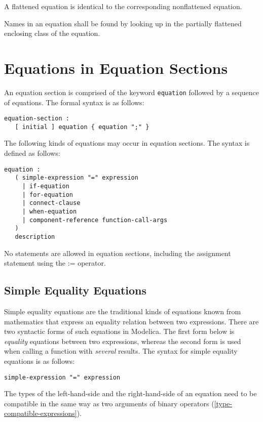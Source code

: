 A flattened equation is identical to the corresponding nonflattened equation.

Names in an equation shall be found by looking up in the partially flattened enclosing class of the equation.

\section{Equations in Equation Sections}\label{equations-in-equation-sections}

An equation section is comprised of the keyword \lstinline!equation! followed by a sequence of equations.
The formal syntax is as follows:
\begin{lstlisting}[language=grammar]
equation-section :
   [ initial ] equation { equation ";" }
\end{lstlisting}

The following kinds of equations may occur in equation sections.
The syntax is defined as follows:
\begin{lstlisting}[language=grammar]
equation :
   ( simple-expression "=" expression
     | if-equation
     | for-equation
     | connect-clause
     | when-equation
     | component-reference function-call-args
   )
   description
\end{lstlisting}
No statements are allowed in equation sections, including the assignment statement using the := operator.

\subsection{Simple Equality Equations}\label{simple-equality-equations}

Simple equality equations are the traditional kinds of equations known from mathematics that express an equality relation between two expressions.
There are two syntactic forms of such equations in Modelica.
The first form below is \emph{equality} equations between two expressions, whereas the second form is used when calling a function with \emph{several} results.
The syntax for simple equality equations is as follows:
\begin{lstlisting}[language=grammar]
simple-expression "=" expression
\end{lstlisting}
The types of the left-hand-side and the right-hand-side of an equation need to be compatible in the same way as two arguments of binary operators (\cref{type-compatible-expressions}).

